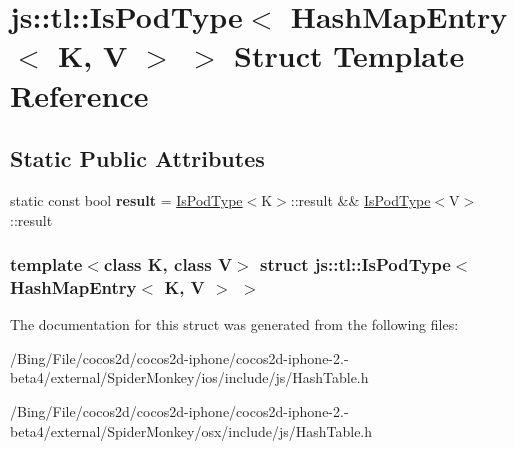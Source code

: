 \hypertarget{structjs_1_1tl_1_1_is_pod_type_3_01_hash_map_entry_3_01_k_00_01_v_01_4_01_4}{\section{js\-:\-:tl\-:\-:Is\-Pod\-Type$<$ Hash\-Map\-Entry$<$ K, V $>$ $>$ Struct Template Reference}
\label{structjs_1_1tl_1_1_is_pod_type_3_01_hash_map_entry_3_01_k_00_01_v_01_4_01_4}
}
\subsection*{Static Public Attributes}
\begin{DoxyCompactItemize}
\item 
\hypertarget{structjs_1_1tl_1_1_is_pod_type_3_01_hash_map_entry_3_01_k_00_01_v_01_4_01_4_a5a2aad46d10c1e17048d7a275e09aac1}{static const bool {\bfseries result} = \hyperlink{structjs_1_1tl_1_1_is_pod_type}{Is\-Pod\-Type}$<$K$>$\-::result \&\& \hyperlink{structjs_1_1tl_1_1_is_pod_type}{Is\-Pod\-Type}$<$V$>$\-::result}\label{structjs_1_1tl_1_1_is_pod_type_3_01_hash_map_entry_3_01_k_00_01_v_01_4_01_4_a5a2aad46d10c1e17048d7a275e09aac1}

\end{DoxyCompactItemize}
\subsubsection*{template$<$class K, class V$>$ struct js\-::tl\-::\-Is\-Pod\-Type$<$ Hash\-Map\-Entry$<$ K, V $>$ $>$}



The documentation for this struct was generated from the following files\-:\begin{DoxyCompactItemize}
\item 
/\-Bing/\-File/cocos2d/cocos2d-\/iphone/cocos2d-\/iphone-\/2.-\/beta4/external/\-Spider\-Monkey/ios/include/js/Hash\-Table.\-h\item 
/\-Bing/\-File/cocos2d/cocos2d-\/iphone/cocos2d-\/iphone-\/2.-\/beta4/external/\-Spider\-Monkey/osx/include/js/Hash\-Table.\-h\end{DoxyCompactItemize}
